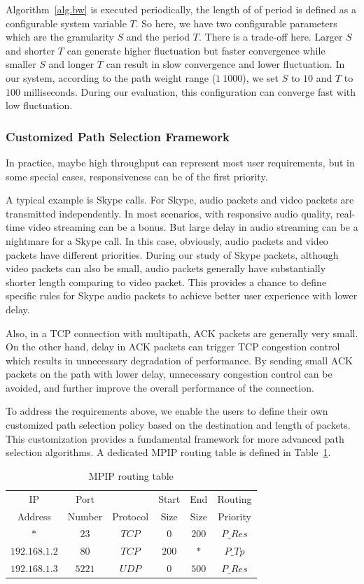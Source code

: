 Algorithm~\ref{alg.bw} is executed periodically, the length of of period is defined as a configurable system variable $T$. So here, we have two configurable parameters which are the granularity $S$ and the period $T$. There is a trade-off here. Larger $S$ and shorter $T$ can generate higher fluctuation but faster convergence while smaller $S$ and longer $T$ can result in slow convergence and lower fluctuation. In our system, according to the path weight range ($1~1000$), we set $S$ to $10$ and $T$ to $100$ milliseconds. During our evaluation, this configuration can converge fast with low fluctuation.

\subsubsection{Customized Path Selection Framework}
\label{sec:resp}
In practice, maybe high throughput can represent most user requirements, but in some special cases, responsiveness can be of the first priority.

A typical example is Skype\cite{skype} calls. For Skype, audio packets and video packets are transmitted independently. In most scenarios, with responsive audio quality, real-time video streaming can be a bonus. But large delay in audio streaming can be a nightmare for a Skype call. In this case, obviously, audio packets and video packets have different priorities. During our study of Skype packets, although video packets can also be small, audio packets generally have substantially shorter length comparing to video packet. This provides a chance to define specific rules for Skype audio packets to achieve better user experience with lower delay.

Also, in a TCP connection with multipath, ACK packets are generally very small. On the other hand, delay in ACK packets can trigger TCP congestion control which results in unnecessary degradation of performance. By sending small ACK packets on the path with lower delay, unnecessary congestion control can be avoided, and further improve the overall performance of the connection.

To address the requirements above, we enable the users to define their own customized path selection policy based on the destination and length of packets. This customization provides a fundamental framework for more advanced path selection algorithms. A dedicated MPIP routing table is defined in Table~\ref{tb.route}.

\begin{table}[htbp]
\caption{\label{tb.route}MPIP routing table}
\centering
\begin{tabular}{|c|c|c|c|c|c|}
\hline
 IP   		&   Port   &          & Start  & End    & Routing       \\
 Address    &  Number     & Protocol & Size   & Size & Priority       \\
\hline
$*$&$23$&$TCP$&$0$&$200$&$P\_Res$   \\
\hline
$192.168.1.2$&$80$&$TCP$&$200$&$*$&$P\_Tp$   \\
\hline
$192.168.1.3$&$5221$&$UDP$&$0$&$500$&$P\_Res$  \\
\hline
\end{tabular}
\end{table}

